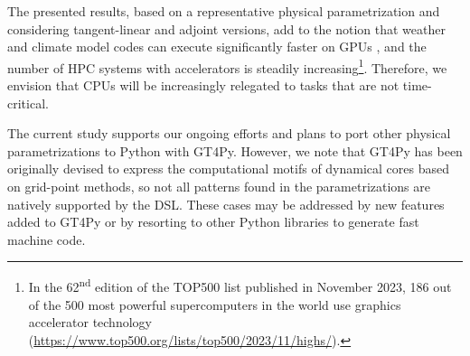 \documentclass[gmd,manuscript,online]{copernicus}
\theoremstyle{theorem}
\theoremstyle{definition}
\theoremstyle{remark}
\theoremstyle{proposition}
\begin{document}
	The presented results, based on a representative physical parametrization and considering tangent-linear and adjoint versions, add to the notion that weather and climate model codes can execute significantly faster on GPUs \citep{fuhrer18}, and the number of HPC systems with accelerators is steadily increasing\footnote{In the 62\textsuperscript{nd} edition of the TOP500 list published in November 2023, 186 out of the 500 most powerful supercomputers in the world use graphics accelerator technology (\url{https://www.top500.org/lists/top500/2023/11/highs/}).}. Therefore, we envision that CPUs will be increasingly relegated to tasks that are not time-critical.


	The current study supports our ongoing efforts and plans to port other physical parametrizations to Python with GT4Py. However, we note that GT4Py has been originally devised to express the computational motifs of dynamical cores based on grid-point methods, so not all patterns found in the parametrizations are natively supported by the DSL. These cases may be addressed by new features added to GT4Py or by resorting to other Python libraries to generate fast machine code.


\end{document}
